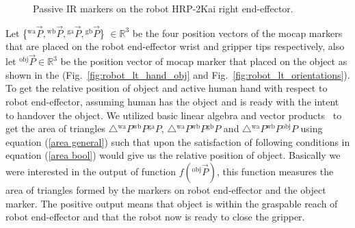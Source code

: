 \begin{figure}[ht]
	\caption{Passive IR markers on the robot HRP-2Kai right end-effector.}
	\label{fig:markerEf}
\end{figure} 


Let \{${}^\text{wa}\vec P, {}^\text{wb}\vec P, {}^\text{ga}\vec P, {}^\text{gb}\vec P$\} $\in \mathbb{R}^{3}$ be the four position vectors of the mocap markers that are placed on the robot end-effector wrist and gripper tips respectively, also let ${}^\text{obj}\vec P\in \mathbb{R}^{3}$ be the position vector of mocap marker that placed on the object as shown in the (Fig.~\ref{fig:robot_lt_hand_obj} and Fig.~\ref{fig:robot_lt_orientations}). To get the relative position of object and active human hand with respect to robot end-effector, assuming human has the object and is ready with the intent to handover the object. We utilized basic linear algebra and vector products~\cite{brand1947vector, crowe1994history, artin2016geometric} to get the area of triangles $\triangle{{}^\text{wa}P {}^\text{wb}P {}^\text{ga}P}$, $\triangle{{}^\text{wa}P {}^\text{wb}P {}^\text{gb}P}$ and $\triangle{{}^\text{wa}P {}^\text{wb}P {}^\text{obj}P}$ using equation (\ref{area general}) such that upon the satisfaction of following conditions in equation (\ref{area bool}) would give us the relative position of object. Basically we were interested in the output of function $f({}^\text{obj}\vec{P})$, this function measures the area of triangles formed by the markers on robot end-effector and the object marker. The positive output means that object is within the graspable reach of robot end-effector and that the robot now is ready to close the gripper.

